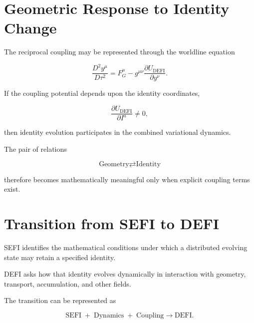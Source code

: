 \documentclass[12pt,oneside]{book}
\newcommand{\SEFI}{\mathrm{SEFI}}
\newcommand{\DEFI}{\mathrm{DEFI}}
\begin{document}
\section{Geometric Response to Identity Change}
\label{sec:geometry-response-identity}

The reciprocal coupling may be represented through the
worldline equation

\begin{equation}
    \frac{D^2y^\mu}{D\tau^2}
    =
    F_G^\mu
    -
    g^{\mu\nu}
    \frac{\partial U_{\DEFI}}
         {\partial y^\nu}.
    \label{eq:geometry-identity-response}
\end{equation}

If the coupling potential depends upon the identity coordinates,

\begin{equation}
    \frac{\partial U_{\DEFI}}
         {\partial I^a}
    \neq
    0,
\end{equation}

then identity evolution participates in the combined
variational dynamics.

The pair of relations

\begin{equation}
    \text{Geometry}
    \rightleftarrows
    \text{Identity}
    \label{eq:bidirectional-geometry-identity}
\end{equation}

therefore becomes mathematically meaningful only when explicit
coupling terms exist.


\section{Transition from SEFI to DEFI}
\label{sec:sefi-to-defi}

SEFI identifies the mathematical conditions under which a
distributed evolving state may retain a specified identity.

DEFI asks how that identity evolves dynamically in interaction
with geometry, transport, accumulation, and other fields.

The transition can be represented as

\begin{equation}
    \boxed{
    \SEFI
    \;+\;
    \text{Dynamics}
    \;+\;
    \text{Coupling}
    \longrightarrow
    \DEFI
    }.
    \label{eq:sefi-defi-transition}
\end{equation}
\end{document}
